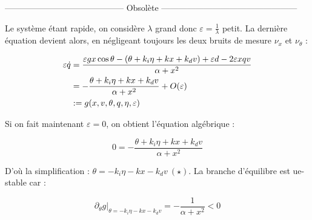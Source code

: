 \documentclass[10pt]{article}
\begin{document}
\vspace{30px}

\noindent ------------------------------------------ Obsolète ------------------------------------------------


\noindent Le système étant rapide,
on considère $\lambda$ grand donc $\varepsilon = \frac{1}{\lambda}$ petit. La dernière équation devient alors,
en négligeant toujours les deux bruits de mesure $\nu_x$ et $\nu_\theta$ :

\begin{align}
	\varepsilon \dot q &= \frac{\varepsilon gx \cos \theta - ( \theta + k_i \eta + k x + k_d v ) +
	\varepsilon d - 2 \varepsilon xqv}{\alpha + x^2} \notag \\
	&= - \frac{\theta + k_i \eta + k x + k_d v}{\alpha + x^2} + O (\varepsilon) \notag \\
	&:= g (x, v, \theta, q, \eta, \varepsilon) \notag
\end{align}

\noindent Si on fait maintenant $\varepsilon = 0$, on obtient l'équation algébrique :

\[
	0 = - \frac{\theta + k_i \eta + k x + k_d v}{\alpha + x^2}
\]

\noindent D'où la simplification :  $\theta = - k_i \eta - k x - k_d v \ (\star)$. La branche d'équilibre est ue-stable car :

\[
	\partial_{\theta} g |_{\theta = - k_i \eta - k x - k_d v} = - \frac{1}{\alpha + x^2} < 0
\]
\end{document}
